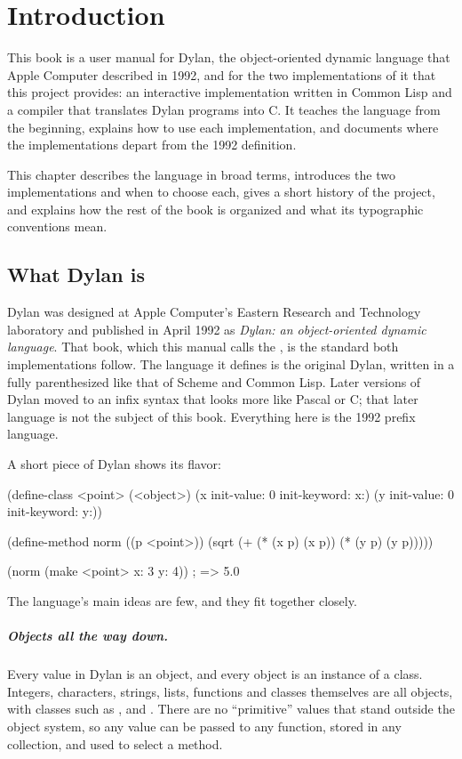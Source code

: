 \chapter{Introduction}\label{ch:intro}

This book is a user manual for Dylan, the object-oriented dynamic language
that Apple Computer described in 1992, and for the two implementations of
it that this project provides: an interactive implementation written in
Common Lisp and a compiler that translates Dylan programs into C. It
teaches the language from the beginning, explains how to use each
implementation, and documents where the implementations depart from the
1992 definition.

This chapter describes the language in broad terms, introduces the two
implementations and when to choose each, gives a short history of the
project, and explains how the rest of the book is organized and what its
typographic conventions mean.

\section{What Dylan is}\label{sec:intro-what}

Dylan was designed at Apple Computer's Eastern Research and Technology
laboratory and published in April 1992 as \emph{Dylan: an object-oriented
dynamic language}. That book, which this manual calls the , is
the standard both implementations follow. The language it defines is the
original Dylan, written in a fully parenthesized  like
that of Scheme and Common Lisp. Later versions of Dylan moved to an infix
syntax that looks more like Pascal or C; that later language is not the
subject of this book. Everything here is the 1992 prefix language.

A short piece of Dylan shows its flavor:

\begin{dylan}
(define-class <point> (<object>)
  (x init-value: 0 init-keyword: x:)
  (y init-value: 0 init-keyword: y:))

(define-method norm ((p <point>))
  (sqrt (+ (* (x p) (x p)) (* (y p) (y p)))))

(norm (make <point> x: 3 y: 4))   ; => 5.0
\end{dylan}

The language's main ideas are few, and they fit together closely.

\paragraph{Objects all the way down.} Every value in Dylan is an object,
and every object is an instance of a class. Integers, characters,
strings, lists, functions and classes themselves are all objects, with
classes such as ,  and .
There are no ``primitive'' values that stand outside the object system,
so any value can be passed to any function, stored in any collection, and
used to select a method.

